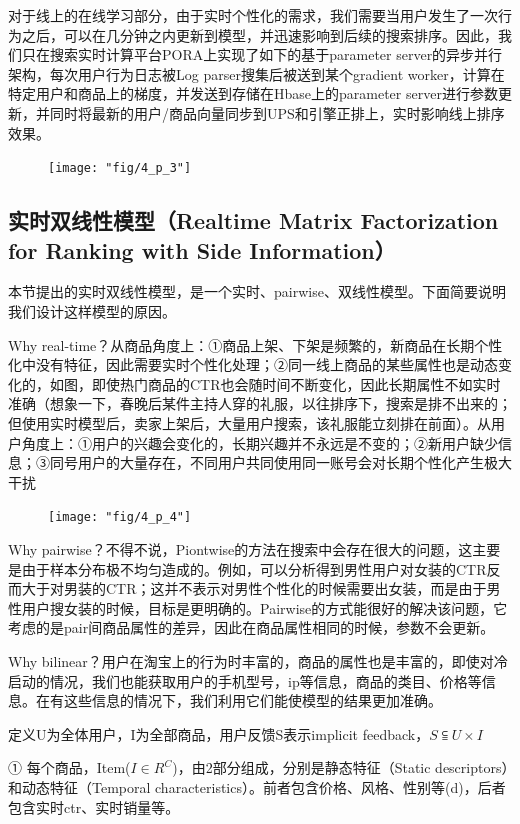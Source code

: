   对于线上的在线学习部分，由于实时个性化的需求，我们需要当用户发生了一次行为之后，可以在几分钟之内更新到模型，并迅速影响到后续的搜索排序。因此，我们只在搜索实时计算平台PORA上实现了如下的基于parameter server的异步并行架构，每次用户行为日志被Log parser搜集后被送到某个gradient worker，计算在特定用户和商品上的梯度，并发送到存储在Hbase上的parameter server进行参数更新，并同时将最新的用户/商品向量同步到UPS和引擎正排上，实时影响线上排序效果。
  
\begin{figure}[h]
	\centering
	\texttt{[image: "fig/4\_p\_3"]}
\end{figure}

\subsection{实时双线性模型（Realtime Matrix Factorization for Ranking with Side Information）} 
本节提出的实时双线性模型，是一个实时、pairwise、双线性模型。下面简要说明我们设计这样模型的原因。

  Why real-time？从商品角度上：①商品上架、下架是频繁的，新商品在长期个性化中没有特征，因此需要实时个性化处理；②同一线上商品的某些属性也是动态变化的，如图，即使热门商品的CTR也会随时间不断变化，因此长期属性不如实时准确（想象一下，春晚后某件主持人穿的礼服，以往排序下，搜索是排不出来的；但使用实时模型后，卖家上架后，大量用户搜索，该礼服能立刻排在前面）。从用户角度上：①用户的兴趣会变化的，长期兴趣并不永远是不变的；②新用户缺少信息；③同号用户的大量存在，不同用户共同使用同一账号会对长期个性化产生极大干扰
  
  \begin{figure}[h]
	\centering
	\texttt{[image: "fig/4\_p\_4"]}
\end{figure}

Why pairwise？不得不说，Piontwise的方法在搜索中会存在很大的问题，这主要是由于样本分布极不均匀造成的。例如，可以分析得到男性用户对女装的CTR反而大于对男装的CTR；这并不表示对男性个性化的时候需要出女装，而是由于男性用户搜女装的时候，目标是更明确的。Pairwise的方式能很好的解决该问题，它考虑的是pair间商品属性的差异，因此在商品属性相同的时候，参数不会更新。

  Why bilinear？用户在淘宝上的行为时丰富的，商品的属性也是丰富的，即使对冷启动的情况，我们也能获取用户的手机型号，ip等信息，商品的类目、价格等信息。在有这些信息的情况下，我们利用它们能使模型的结果更加准确。

定义U为全体用户，I为全部商品，用户反馈S表示implicit feedback，$S\subseteqq U \times I $

  ① 每个商品，Item($I \in R^C$)，由2部分组成，分别是静态特征（Static descriptors）和动态特征（Temporal characteristics）。前者包含价格、风格、性别等(d)，后者包含实时ctr、实时销量等。
  
